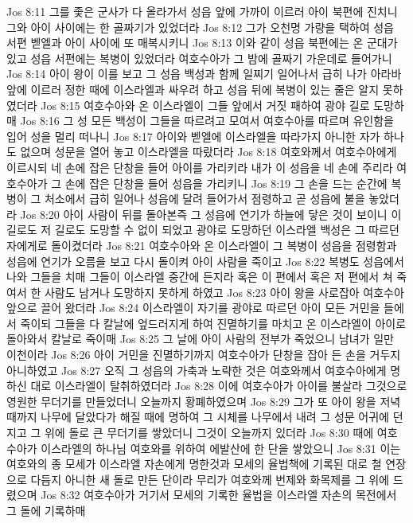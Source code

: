 Jos 8:11  그를 좇은 군사가 다 올라가서 성읍 앞에 가까이 이르러 아이 북편에 진치니 그와 아이 사이에는 한 골짜기가 있었더라
Jos 8:12  그가 오천명 가량을 택하여 성읍 서편 벧엘과 아이 사이에 또 매복시키니
Jos 8:13  이와 같이 성읍 북편에는 온 군대가 있고 성읍 서편에는 복병이 있었더라 여호수아가 그 밤에 골짜기 가운데로 들어가니
Jos 8:14  아이 왕이 이를 보고 그 성읍 백성과 함께 일찌기 일어나서 급히 나가 아라바 앞에 이르러 정한 때에 이스라엘과 싸우려 하고 성읍 뒤에 복병이 있는 줄은 알지 못하였더라
Jos 8:15  여호수아와 온 이스라엘이 그들 앞에서 거짓 패하여 광야 길로 도망하매
Jos 8:16  그 성 모든 백성이 그들을 따르려고 모여서 여호수아를 따르며 유인함을 입어 성을 멀리 떠나니
Jos 8:17  아이와 벧엘에 이스라엘을 따라가지 아니한 자가 하나도 없으며 성문을 열어 놓고 이스라엘을 따랐더라
Jos 8:18  여호와께서 여호수아에게 이르시되 네 손에 잡은 단창을 들어 아이를 가리키라 내가 이 성읍을 네 손에 주리라 여호수아가 그 손에 잡은 단창을 들어 성읍을 가리키니
Jos 8:19  그 손을 드는 순간에 복병이 그 처소에서 급히 일어나 성읍에 달려 들어가서 점령하고 곧 성읍에 불을 놓았더라
Jos 8:20  아이 사람이 뒤를 돌아본즉 그 성읍에 연기가 하늘에 닿은 것이 보이니 이 길로도 저 길로도 도망할 수 없이 되었고 광야로 도망하던 이스라엘 백성은 그 따르던 자에게로 돌이켰더라
Jos 8:21  여호수아와 온 이스라엘이 그 복병이 성읍을 점령함과 성읍에 연기가 오름을 보고 다시 돌이켜 아이 사람을 죽이고
Jos 8:22  복병도 성읍에서 나와 그들을 치매 그들이 이스라엘 중간에 든지라 혹은 이 편에서 혹은 저 편에서 쳐 죽여서 한 사람도 남거나 도망하지 못하게 하였고
Jos 8:23  아이 왕을 사로잡아 여호수아 앞으로 끌어 왔더라
Jos 8:24  이스라엘이 자기를 광야로 따르던 아이 모든 거민을 들에서 죽이되 그들을 다 칼날에 엎드러지게 하여 진멸하기를 마치고 온 이스라엘이 아이로 돌아와서 칼날로 죽이매
Jos 8:25  그 날에 아이 사람의 전부가 죽었으니 남녀가 일만 이천이라
Jos 8:26  아이 거민을 진멸하기까지 여호수아가 단창을 잡아 든 손을 거두지 아니하였고
Jos 8:27  오직 그 성읍의 가축과 노략한 것은 여호와께서 여호수아에게 명하신 대로 이스라엘이 탈취하였더라
Jos 8:28  이에 여호수아가 아이를 불살라 그것으로 영원한 무더기를 만들었더니 오늘까지 황폐하였으며
Jos 8:29  그가 또 아이 왕을 저녁 때까지 나무에 달았다가 해질 때에 명하여 그 시체를 나무에서 내려 그 성문 어귀에 던지고 그 위에 돌로 큰 무더기를 쌓았더니 그것이 오늘까지 있더라
Jos 8:30  때에 여호수아가 이스라엘의 하나님 여호와를 위하여 에발산에 한 단을 쌓았으니
Jos 8:31  이는 여호와의 종 모세가 이스라엘 자손에게 명한것과 모세의 율법책에 기록된 대로 철 연장으로 다듬지 아니한 새 돌로 만든 단이라 무리가 여호와께 번제와 화목제를 그 위에 드렸으며
Jos 8:32  여호수아가 거기서 모세의 기록한 율법을 이스라엘 자손의 목전에서 그 돌에 기록하매
